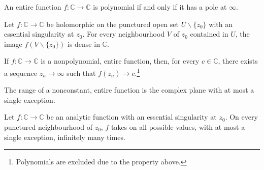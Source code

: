     \begin{property}[Polynomials]
        An entire function $f:\mathbb{C}\rightarrow\mathbb{C}$ is polynomial if and only if it has a pole at $\infty$.
    \end{property}

    \begin{theorem}
        Let $f:\mathbb{C}\rightarrow\mathbb{C}$ be holomorphic on the punctured open set $U\backslash\{z_0\}$ with an essential singularity at $z_0$. For every neighbourhood $V$ of $z_0$ contained in $U$, the image $f(V\backslash\{z_0\})$ is dense in $\mathbb{C}$.
    \end{theorem}
    \begin{result}
        If $f:\mathbb{C}\rightarrow\mathbb{C}$ is a nonpolynomial, entire function, then, for every $c\in\mathbb{C}$, there exists a sequence $z_n\longrightarrow\infty$ such that $f(z_n)\longrightarrow c$.\footnote{Polynomials are excluded due to the property above.}
    \end{result}

    \begin{theorem}
        The range of a nonconstant, entire function is the complex plane with at most a single exception.
    \end{theorem}
    \begin{theorem}
        Let $f:\mathbb{C}\rightarrow\mathbb{C}$ be an analytic function with an essential singularity at $z_0$. On every punctured neighbourhood of $z_0$, $f$ takes on all possible values, with at most a single exception, infinitely many times.
    \end{theorem}


